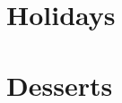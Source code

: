 \documentclass{article}
\begin{document}
\tableofcontents

\section{Holidays}




\section{Desserts}




\printindex
\end{document}
